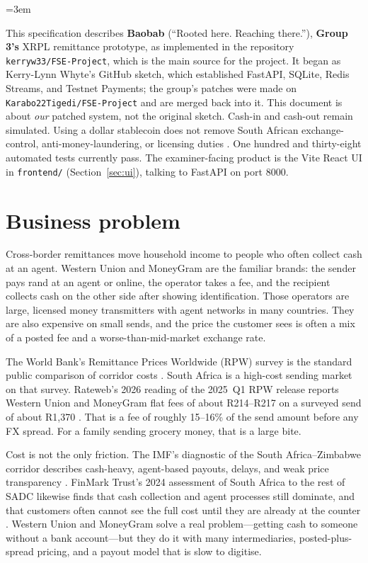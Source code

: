 \documentclass[11pt]{article}
\begin{document}
\emergencystretch=3em

\noindent
This specification describes \textbf{Baobab} (``Rooted here. Reaching there.''), \textbf{Group 3's} XRPL remittance prototype, as implemented in the repository \texttt{kerryw33/FSE-Project}, which is the main source for the project. It began as Kerry-Lynn Whyte's GitHub sketch, which established FastAPI, SQLite, Redis Streams, and Testnet Payments; the group's patches were made on \texttt{Karabo22Tigedi/FSE-Project} and are merged back into it. This document is about \emph{our} patched system, not the original sketch. Cash-in and cash-out remain simulated. Using a dollar stablecoin does not remove South African exchange-control, anti-money-laundering, or licensing duties \citep{UCTBrief2026}. One hundred and thirty-eight automated tests currently pass. The examiner-facing product is the Vite React UI in \texttt{frontend/} (Section~\ref{sec:ui}), talking to FastAPI on port 8000.

\section{Business problem}
Cross-border remittances move household income to people who often collect cash at an agent. Western Union and MoneyGram are the familiar brands: the sender pays rand at an agent or online, the operator takes a fee, and the recipient collects cash on the other side after showing identification. Those operators are large, licensed money transmitters with agent networks in many countries. They are also expensive on small sends, and the price the customer sees is often a mix of a posted fee and a worse-than-mid-market exchange rate.

The World Bank's Remittance Prices Worldwide (RPW) survey is the standard public comparison of corridor costs \citep{WorldBankRPW}. South Africa is a high-cost sending market on that survey. Rateweb's 2026 reading of the 2025~Q1 RPW release reports Western Union and MoneyGram flat fees of about R214--R217 on a surveyed send of about R1{,}370 \citep{Rateweb2026}. That is a fee of roughly 15--16\% of the send amount before any FX spread. For a family sending grocery money, that is a large bite.

Cost is not the only friction. The IMF's diagnostic of the South Africa--Zimbabwe corridor describes cash-heavy, agent-based payouts, delays, and weak price transparency \citep{IMF2025SAZim}. FinMark Trust's 2024 assessment of South Africa to the rest of SADC likewise finds that cash collection and agent processes still dominate, and that customers often cannot see the full cost until they are already at the counter \citep{FinMark2024}. Western Union and MoneyGram solve a real problem---getting cash to someone without a bank account---but they do it with many intermediaries, posted-plus-spread pricing, and a payout model that is slow to digitise.
\end{document}
